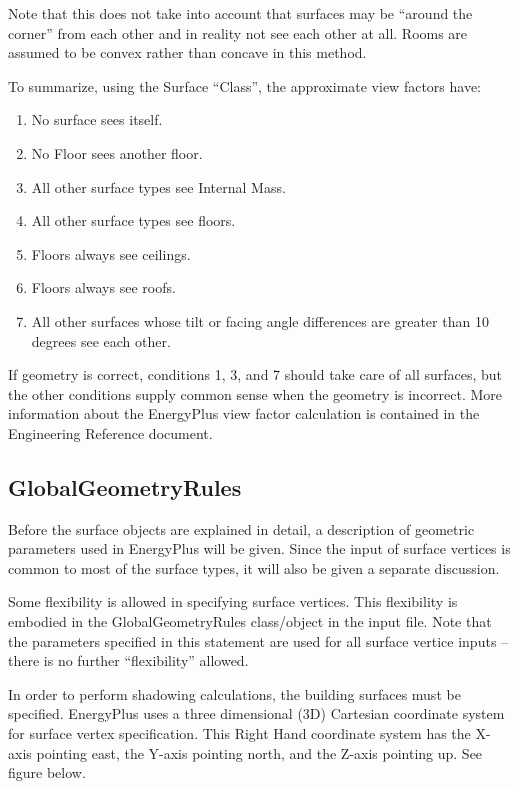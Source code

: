 Note that this does not take into account that surfaces may be ``around the corner'' from each other and in reality not see each other at all. Rooms are assumed to be convex rather than concave in this method.

To summarize, using the Surface ``Class'', the approximate view factors have:

\begin{enumerate}
\item
  No surface sees itself.
\item
  No Floor sees another floor.
\item
  All other surface types see Internal Mass.
\item
  All other surface types see floors.
\item
  Floors always see ceilings.
\item
  Floors always see roofs.
\item
  All other surfaces whose tilt or facing angle differences are greater than 10 degrees see each other.
\end{enumerate}

If geometry is correct, conditions 1, 3, and 7 should take care of all surfaces, but the other conditions supply common sense when the geometry is incorrect. More information about the EnergyPlus view factor calculation is contained in the Engineering Reference document.

\subsection{GlobalGeometryRules}\label{globalgeometryrules}

Before the surface objects are explained in detail, a description of geometric parameters used in EnergyPlus will be given. Since the input of surface vertices is common to most of the surface types, it will also be given a separate discussion.

Some flexibility is allowed in specifying surface vertices. This flexibility is embodied in the GlobalGeometryRules class/object in the input file. Note that the parameters specified in this statement are used for all surface vertice inputs -- there is no further ``flexibility'' allowed.

In order to perform shadowing calculations, the building surfaces must be specified. EnergyPlus uses a three dimensional (3D) Cartesian coordinate system for surface vertex specification. This Right Hand coordinate system has the X-axis pointing east, the Y-axis pointing north, and the Z-axis pointing up. See figure below.

